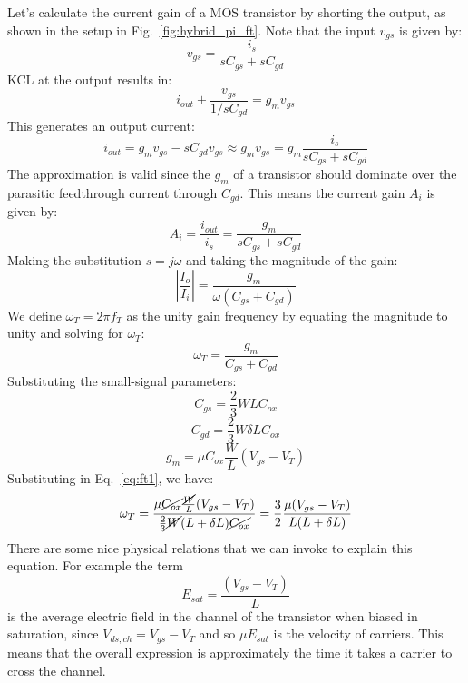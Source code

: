 Let's calculate the current gain of a MOS transistor by shorting the output, as shown in the setup in Fig.~\ref{fig:hybrid_pi_ft}.  Note that the input $v_{gs}$ is given by:
\begin{equation}
	{v_{gs}} = \frac{{{i_s}}}{{s{C_{gs}} + s{C_{gd}}}}
\end{equation}
%
KCL at the output results in:
%
\begin{equation} 
	{i_{out}} + \frac{{{v_{gs}}}}{{1/s{C_{gd}}}} = {g_m}{v_{gs}} 
\end{equation}
This generates an output current:
%
\begin{equation} 
	{i_{out}} = {g_m}{v_{gs}} - s{C_{gd}}{v_{gs}} \approx {g_m}{v_{gs}} = {g_m}\frac{{{i_s}}}{{s{C_{gs}} + s{C_{gd}}}}
\end{equation}
%
The approximation is valid since the $g_m$ of a transistor should dominate over the parasitic feedthrough current through $C_{gd}$.  This means the current gain $A_i$ is given by:
%
\begin{equation} 
	{A_i} = \frac{{{i_{out}}}}{{{i_s}}} = \frac{{{g_m}}}{{s{C_{gs}} + s{C_{gd}}}} 
\end{equation}
Making the substitution $s = j\omega$ and taking the magnitude of the gain:
%
\begin{equation} 
	\left| {\frac{{{I_o}}}{{{I_i}}}} \right| = \frac{{{g_m}}}{{\omega ({C_{gs}} + {C_{gd}})}} 
\end{equation}
%
We define $\omega_T = 2\pi f_T$ as the unity gain frequency by equating the magnitude to unity and solving for $\omega_T$:
%
\begin{equation} 
	{\omega _T} = \frac{{{g_m}}}{{{C_{gs}} + {C_{gd}}}}   \label{eq:ft1}
\end{equation}
%
Substituting the small-signal parameters:
%
\begin{equation}
	C_{gs} = \frac{2}{3} W L C_{ox}
\end{equation}
%
\begin{equation}
	C_{gd} = \frac{2}{3} W \delta L C_{ox}
\end{equation}
%
\begin{equation}
	g_m = \mu C_{ox} \frac{W}{L} (V_{gs} - V_T)
\end{equation}
%
Substituting in Eq.~\ref{eq:ft1}, we have:
%
\begin{equation} 
	{\omega _T} = \frac{\mu \cancel{C_{ox}} \frac{\cancel{W}}{L} (V_{gs} - V_T)}
				 {\frac{2}{3} \cancel{W} (L + \delta L) \cancel{C_{ox}}} =
				 \frac{3}{2} \frac{\mu (V_{gs} - V_T)}
				 	{L(L+\delta L)}  \label{eq:ft2}
\end{equation}
%
There are some nice physical relations that we can invoke to explain this equation.  For example the term
%
\begin{equation}
	E_{sat} = \frac{(V_{gs} - V_T)}{L}
\end{equation}
%
is the average electric field in the channel of the transistor when biased in saturation, since $V_{ds,ch} = V_{gs} - V_T$ and so $\mu E_{sat}$ is the velocity of carriers.  This means that the overall expression is approximately the time it takes a carrier to cross the channel.  

